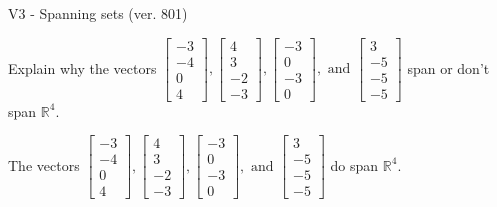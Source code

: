 \begin{exercise}
  \begin{exerciseTitle}V3 - Spanning sets (ver. 801)\end{exerciseTitle}
  \begin{exerciseStatement}
    Explain why the vectors \(\left[\begin{array}{r}
-3 \\
-4 \\
0 \\
4
\end{array}\right] , \left[\begin{array}{r}
4 \\
3 \\
-2 \\
-3
\end{array}\right] , \left[\begin{array}{r}
-3 \\
0 \\
-3 \\
0
\end{array}\right] , \text{ and } \left[\begin{array}{r}
3 \\
-5 \\
-5 \\
-5
\end{array}\right]\) span or don't span \(\mathbb{R}^4\). 
	


  \end{exerciseStatement}
  \begin{exerciseAnswer}
   The vectors \(\left[\begin{array}{r}
-3 \\
-4 \\
0 \\
4
\end{array}\right] , \left[\begin{array}{r}
4 \\
3 \\
-2 \\
-3
\end{array}\right] , \left[\begin{array}{r}
-3 \\
0 \\
-3 \\
0
\end{array}\right] , \text{ and } \left[\begin{array}{r}
3 \\
-5 \\
-5 \\
-5
\end{array}\right]\) 
  	 do  
	span \(\mathbb{R}^4\).
  


  \end{exerciseAnswer}
\end{exercise}